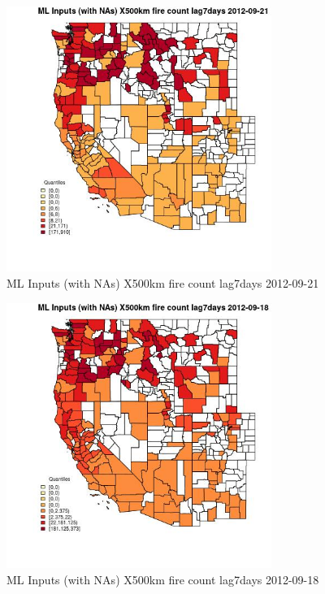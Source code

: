\begin{figure} 
\centering  
\includegraphics[width=0.77\textwidth]{Code_Outputs/Report_ML_input_PM25_Step4_part_e_de_duplicated_aves_compiled_2019-05-14wNAs_CountyX500km_fire_count_lag7daysMean2012-09-21_2012-09-21.jpg} 
\caption{\label{fig:Report_ML_input_PM25_Step4_part_e_de_duplicated_aves_compiled_2019-05-14wNAsCountyX500km_fire_count_lag7daysMean2012-09-21_2012-09-21}ML Inputs (with NAs) X500km fire count lag7days 2012-09-21} 
\end{figure} 
 

\begin{figure} 
\centering  
\includegraphics[width=0.77\textwidth]{Code_Outputs/Report_ML_input_PM25_Step4_part_e_de_duplicated_aves_compiled_2019-05-14wNAs_CountyX500km_fire_count_lag7daysMean2012-09-18_2012-09-18.jpg} 
\caption{\label{fig:Report_ML_input_PM25_Step4_part_e_de_duplicated_aves_compiled_2019-05-14wNAsCountyX500km_fire_count_lag7daysMean2012-09-18_2012-09-18}ML Inputs (with NAs) X500km fire count lag7days 2012-09-18} 
\end{figure} 
 

